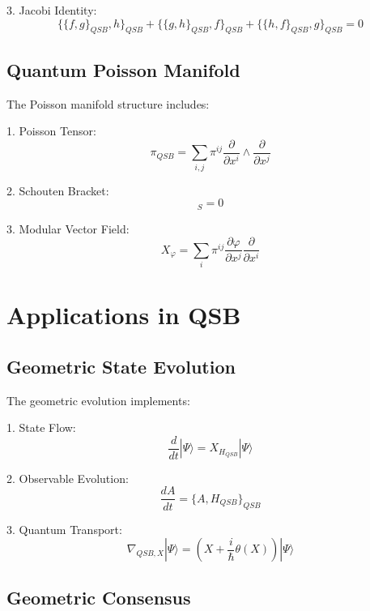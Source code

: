 \documentclass[12pt]{article}
\begin{document}
3. Jacobi Identity:
\begin{equation}
\{\{f,g\}_{QSB},h\}_{QSB} + \{\{g,h\}_{QSB},f\}_{QSB} + \{\{h,f\}_{QSB},g\}_{QSB} = 0
\end{equation}

\subsection{Quantum Poisson Manifold}

The Poisson manifold structure includes:

1. Poisson Tensor:
\begin{equation}
π_{QSB} = \sum_{i,j} π^{ij} \frac{\partial}{\partial x^i} \wedge \frac{\partial}{\partial x^j}
\end{equation}

2. Schouten Bracket:
\begin{equation}
[π_{QSB}, π_{QSB}]_S = 0
\end{equation}

3. Modular Vector Field:
\begin{equation}
X_φ = \sum_i π^{ij} \frac{\partial φ}{\partial x^j} \frac{\partial}{\partial x^i}
\end{equation}

\section{Applications in QSB}

\subsection{Geometric State Evolution}

The geometric evolution implements:

1. State Flow:
\begin{equation}
\frac{d}{dt}|Ψ\rangle = X_{H_{QSB}}|Ψ\rangle
\end{equation}

2. Observable Evolution:
\begin{equation}
\frac{dA}{dt} = \{A,H_{QSB}\}_{QSB}
\end{equation}

3. Quantum Transport:
\begin{equation}
\nabla_{QSB,X}|Ψ\rangle = (X + \frac{i}{\hbar}θ(X))|Ψ\rangle
\end{equation}

\subsection{Geometric Consensus}
\end{document}
